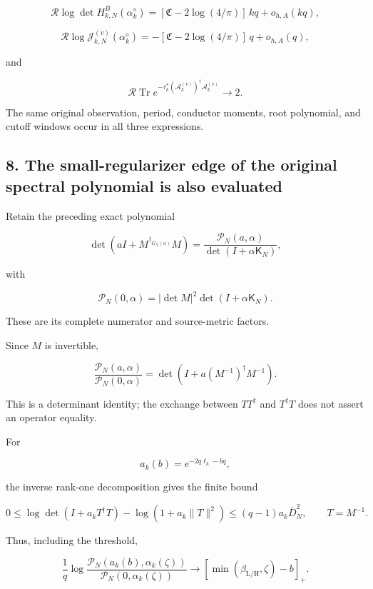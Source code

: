 \documentclass[11pt]{article}
\begin{document}
\[
\boxed{
\mathcal R\log\det H^B_{k,N}(\alpha_k^\diamond)
=
[\mathfrak C-2\log(4/\pi)]\,kq+o_{h,A}(kq),
}
\tag{43}
\]

\[
\boxed{
\mathcal R\log\mathscr J_{k,N}^{(v)}(\alpha_k^\diamond)
=
-[\mathfrak C-2\log(4/\pi)]\,q+o_{h,A}(q),
}
\tag{44}
\]

and

\[
\boxed{
\mathcal R\operatorname{Tr}
e^{-\tau_k^*(\mathscr A_k^{(v)})^\dagger\mathscr A_k^{(v)}}
\longrightarrow2.
}
\tag{45}
\]

The same original observation, period, conductor moments, root polynomial, and cutoff windows occur in all three expressions.

\subsection{8. The small-regularizer edge of the original spectral polynomial is also evaluated}\label{the-small-regularizer-edge-of-the-original-spectral-polynomial-is-also-evaluated}

Retain the preceding exact polynomial

\[
\det(aI+M^{\dagger_{G_N(\alpha)}}M)
=
\frac{\mathscr P_N(a,\alpha)}
{\det(I+\alpha\mathsf K_N)},
\]

with

\[
\mathscr P_N(0,\alpha)
=
|\det M|^2\det(I+\alpha\mathsf K_N).
\]

These are its complete numerator and source-metric factors.

Since \(M\) is invertible,

\[
\boxed{
\frac{\mathscr P_N(a,\alpha)}
{\mathscr P_N(0,\alpha)}
=
\det\left(I+a(M^{-1})^\dagger M^{-1}\right).
}
\tag{46}
\]

This is a determinant identity; the exchange between \(TT^\dagger\) and \(T^\dagger T\) does not assert an operator equality.

For

\[
a_k(b)=e^{-2q\ell_k-bq},
\]

the inverse rank-one decomposition gives the finite bound

\[
0\le
\log\det(I+a_kT^\dagger T)
-\log(1+a_k\|T\|^2)
\le(q-1)a_k\overline D_N^2,
\qquad T=M^{-1}.
\]

Thus, including the threshold,

\[
\boxed{
\frac1q
\log
\frac{\mathscr P_N(a_k(b),\alpha_k(\zeta))}
{\mathscr P_N(0,\alpha_k(\zeta))}
\longrightarrow
[\min(\beta_{\mathrm L/\mathrm H},\zeta)-b]_+.
}
\tag{47}
\]
\end{document}
